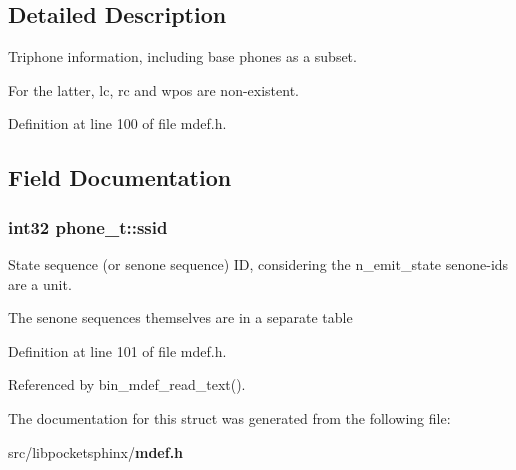 \subsection{Detailed Description}
Triphone information, including base phones as a subset. 

For the latter, lc, rc and wpos are non-\/existent. 

Definition at line 100 of file mdef.\-h.



\subsection{Field Documentation}
\subsubsection[{ssid}]{\setlength{\rightskip}{0pt plus 5cm}int32 phone\-\_\-t\-::ssid}\label{structphone__t_af2f31836358c1c29c38a361b3923b859}


State sequence (or senone sequence) I\-D, considering the n\-\_\-emit\-\_\-state senone-\/ids are a unit. 

The senone sequences themselves are in a separate table 

Definition at line 101 of file mdef.\-h.



Referenced by bin\-\_\-mdef\-\_\-read\-\_\-text().



The documentation for this struct was generated from the following file\-:\begin{DoxyCompactItemize}
\item 
src/libpocketsphinx/{\bf mdef.\-h}\end{DoxyCompactItemize}
